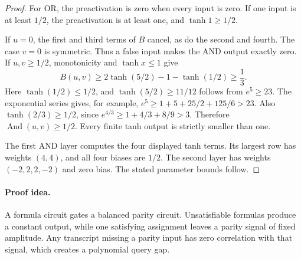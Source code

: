 \begin{proof}
For OR, the preactivation is zero when every input is zero.  If
one input is at least \(1/2\), the preactivation is at least one,
and \(\tanh1\ge1/2\).

If \(u=0\), the first and third terms of \(B\) cancel, as do
the second and fourth.  The case \(v=0\) is symmetric.  Thus a
false input makes the AND output exactly zero.  If \(u,v\ge1/2\),
monotonicity and \(\tanh x\le1\) give
\[
 B(u,v)\ge2\tanh(5/2)-1-\tanh(1/2)\ge\frac13.
\]
Here \(\tanh(1/2)\le1/2\), and
\(\tanh(5/2)\ge11/12\) follows from \(e^5\ge23\).
The exponential series gives, for example,
\(e^5\ge1+5+25/2+125/6>23\).
Also \(\tanh(2/3)\ge1/2\), since
\(e^{4/3}\ge1+4/3+8/9>3\).  Therefore
\(\operatorname{And}(u,v)\ge1/2\).  Every finite tanh output
is strictly smaller than one.

The first AND layer computes the four displayed tanh terms.
Its largest row has weights \((4,4)\), and all four biases are
\(1/2\).  The second layer has weights \((-2,2,2,-2)\)
and zero bias.  The stated parameter bounds follow.
\end{proof}

\paragraph{Proof idea.}
A formula circuit gates a balanced parity circuit. Unsatisfiable
formulas produce a constant output, while one satisfying assignment leaves
a parity signal of fixed amplitude. Any transcript missing a parity input
has zero correlation with that signal, which creates a polynomial query gap.

